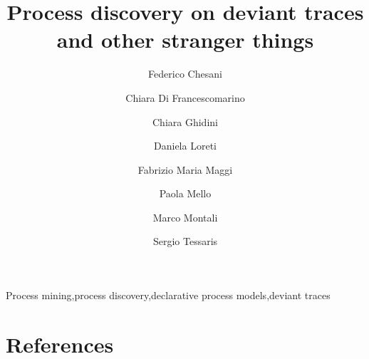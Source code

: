 \documentclass[review]{elsarticle}
\newcommand{\tcolor}[2]{\color{#1}{#2}\color{black}}
\theoremstyle{definition}
\begin{document}
\begin{frontmatter}

\title{Process discovery on deviant traces and other stranger things}

\author[disi]{Federico Chesani}
\author[fbk]{Chiara Di Francescomarino}
\author[fbk]{Chiara Ghidini}
\author[disi]{Daniela Loreti}

\author[unibz]{Fabrizio Maria Maggi}
\author[disi]{Paola Mello}
\author[unibz]{Marco Montali}
\author[unibz]{Sergio Tessaris}

\address[disi]{DISI - University of Bologna, Italy}
\address[fbk]{Fondazione Bruno Kessler, Trento, Italy}
\address[unibz]{Free University of Bozen/Bolzano, Italy}




\begin{abstract}
\tcolor{blue}{abstract goes here}
\end{abstract}

\begin{keyword}
Process mining\sep process discovery\sep declarative process models\sep deviant traces
\end{keyword}

\end{frontmatter}

\linenumbers












\section*{References}



\end{document}
